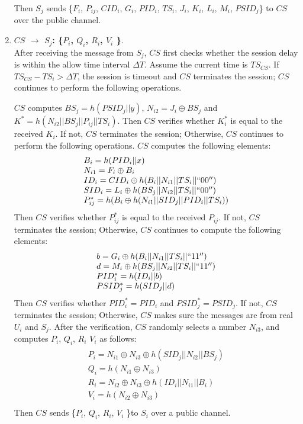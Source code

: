 \documentclass[preprint,12pt]{elsarticle}
\begin{document}
\begin{enumerate}[Step 1:]
Then $S_j$ sends \{$F_i$, $P_{ij}$, $CID_i$, $G_i$, $PID_i$, $TS_i$, $J_i$, $K_i$, $L_i$, $M_i$, $PSID_j$\} to $CS$ over the public channel.

\item \textbf{$CS$ $\rightarrow$ $S_j$: \{$P_i$, $Q_i$, $R_i$, $V_i$ \}}.\\
After receiving the message from $S_j$, $CS$ first checks whether the session delay is within the allow time interval $\Delta T$. Assume the current time is $TS_{CS}$. If $TS_{CS}-TS_i> \Delta T$, the session is timeout and $CS$ terminates the session; $CS$ continues to perform the following operations.

$CS$ computes $BS_j=h(PSID_j||y)$, $N_{i2}=J_i\oplus BS_j$ and $K^*=h(N_{i2}||BS_j||P_{ij}||TS_i)$.  Then $CS$ verifies whether $K^*_i$ is equal to the received $K_i$. If not, $CS$ terminates the session; Otherwise, $CS$ continues to perform the following operations. $CS$ computes the following elements:
\begin{eqnarray}
\left.\begin{array}{l}
B_i=h(PID_i||x)\\
N_{i1}=F_i\oplus B_i\\
ID_i=CID_i\oplus h(B_i||N_{i1}||TS_i||``00'')\\
SID_i=L_i\oplus h(BS_j||N_{i2}||TS_i||``00'')\\
P^*_{ij}=h(B_i\oplus h(N_{i1}||SID_j||PID_i||TS_i))\\
\end{array} \right.
\end{eqnarray}
Then $CS$ verifies whether $P^*_{ij}$ is equal to the received $P_{ij}$. If not, $CS$ terminates the session; Otherwise, $CS$ continues to compute the following elements:
\begin{eqnarray}
\left.\begin{array}{l}
b=G_i\oplus h(B_i||N_{i1}||TS_i||``11'')\\
d=M_i\oplus h(BS_j||N_{i2}||TS_i||``11'')\\
PID^*_i=h(ID_i||b)\\
PSID^*_j=h(SID_j||d)
\end{array} \right.
\end{eqnarray}
Then $CS$ verifies whether $PID^*_i=PID_i$ and $PSID^*_j=PSID_j$. If not, $CS$ terminates the session; Otherwise, $CS$  makes sure the messages are from real $U_i$ and $S_j$. After the verification, $CS$ randomly selects a number $N_{i3}$, and computes $P_i$, $Q_i$, $R_i$ $V_i$ as follows:
\begin{eqnarray}
\left.\begin{array}{l}
P_i=N_{i1}\oplus N_{i3}\oplus h(SID_j||N_{i2}||BS_j)\\
Q_i=h(N_{i1}\oplus N_{i3})\\
R_i=N_{i2}\oplus N_{i3}\oplus h(ID_i||N_{i1}||B_i)\\
V_i=h(N_{i2} \oplus N_{i3})\\
\end{array} \right.
\end{eqnarray}
Then $CS$ sends \{$P_i$, $Q_i$, $R_i$, $V_i$ \}to $S_i$ over a public channel.


\end{enumerate}
\end{document}
